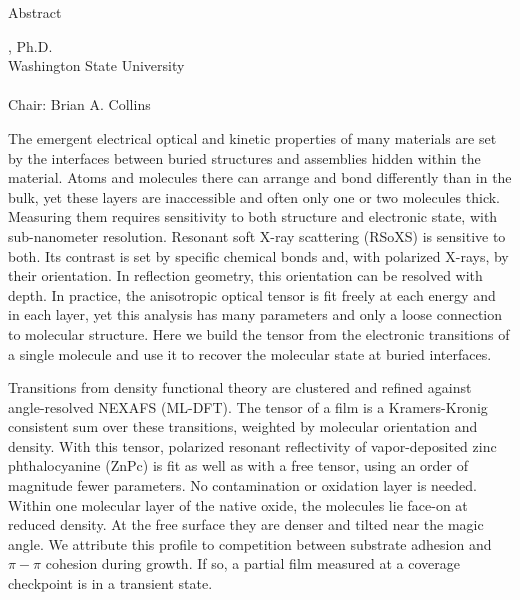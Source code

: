 \begin{center}
  {\doublespacing\MakeUppercase{\thesistitle}\par}
  \vspace{3\baselineskip}
  Abstract\par
  \vspace{\baselineskip}
  {\singlespacing
  \thesisauthor, Ph.D.\\
  Washington State University\\
  \thesisdate\\[\baselineskip]
  Chair: Brian A. Collins\par}
\end{center}

The emergent electrical optical and kinetic properties of many materials are set by the interfaces between buried structures and assemblies hidden within the material. Atoms and molecules there can arrange and bond differently than in the bulk, yet these layers are inaccessible and often only one or two molecules thick. Measuring them requires sensitivity to both structure and electronic state, with sub-nanometer resolution. Resonant soft X-ray scattering (RSoXS) is sensitive to both. Its contrast is set by specific chemical bonds and, with polarized X-rays, by their orientation. In reflection geometry, this orientation can be resolved with depth. In practice, the anisotropic optical tensor is fit freely at each energy and in each layer, yet this analysis has many parameters and only a loose connection to molecular structure. Here we build the tensor from the electronic transitions of a single molecule and use it to recover the molecular state at buried interfaces.

Transitions from density functional theory are clustered and refined against angle-resolved NEXAFS (ML-DFT). The tensor of a film is a Kramers-Kronig consistent sum over these transitions, weighted by molecular orientation and density. With this tensor, polarized resonant reflectivity of vapor-deposited zinc phthalocyanine (ZnPc) is fit as well as with a free tensor, using an order of magnitude fewer parameters. No contamination or oxidation layer is needed. Within one molecular layer of the native oxide, the molecules lie face-on at reduced density. At the free surface they are denser and tilted near the magic angle. We attribute this profile to competition between substrate adhesion and \(\pi - \pi\) cohesion during growth. If so, a partial film measured at a coverage checkpoint is in a transient state.

